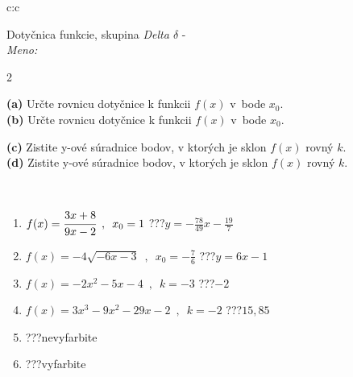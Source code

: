 \documentclass[10pt]{report}
\begin{document}
\begin{tabular}{c:c}
\begin{minipage}[c][104.5mm][t]{0.5\linewidth}
\begin{center}
\vspace{7mm}
{\huge Dotyčnica funkcie, skupina \textit{Delta $\delta$} -}\\[5mm]
\textit{Meno:}\phantom{xxxxxxxxxxxxxxxxxxxxxxxxxxxxxxxxxxxxxxxxxxxxxxxxxxxxxxxxxxxxxxxxx}\\[5mm]
\begin{minipage}{0.95\linewidth}
\begin{center}
{\small \begin{multicols}{2} \raggedright
\textbf{(a)} Určte rovnicu dotyčnice k funkcii \(f(x)\) v~bode \(x_0\). \\[1mm]
\textbf{(b)} Určte rovnicu dotyčnice k funkcii \(f(x)\) v~bode \(x_0\). \par \columnbreak
\textbf{(c)} Zistite y-ové súradnice bodov, v ktorých je sklon \(f(x)\) rovný \(k\). \\[1mm]
\textbf{(d)} Zistite y-ové súradnice bodov, v ktorých je sklon \(f(x)\) rovný \(k\). \\[1mm]
\end{multicols}
}
\end{center}
\end{minipage}
\\[4mm]
\begin{minipage}{0.79\linewidth}
\begin{center}
\begin{varwidth}{\linewidth}
\begin{enumerate}
\normalsizerr
\item $f(x)=\cfrac{3x+8}{9x-2}\enspace , \enspace x_0=1$\quad \dotfill\; ???\;\dotfill \quad $y = -\frac{78}{49}x-\frac{19}{7}$
\item $f(x)=-4\sqrt{-6x-3}\enspace , \enspace x_0=-\frac{7}{6}$\quad \dotfill\; ???\;\dotfill \quad $y = 6x-1$
\item $f(x)=-2x^2-5x-4\enspace , \enspace k=-3$\quad \dotfill\; ???\;\dotfill \quad $-2$
\item $f(x)=3x^3-9x^2-29x-2\enspace , \enspace k=-2$\quad \dotfill\; ???\;\dotfill \quad $15 , 85$
\item \quad \dotfill\; ???\;\dotfill \quad nevyfarbite
\item \quad \dotfill\; ???\;\dotfill \quad vyfarbite
\end{enumerate}
\end{varwidth}

\end{center}
\end{minipage}
\end{center}
\end{minipage}
\end{tabular}
\end{document}
